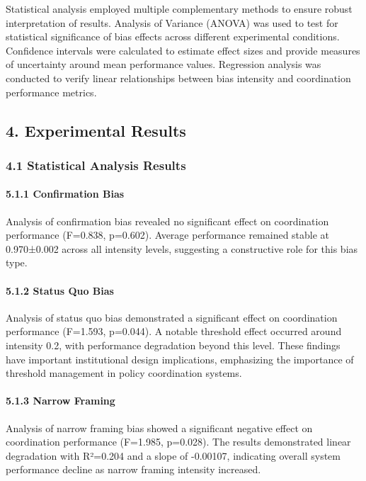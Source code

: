 Statistical analysis employed multiple complementary methods to ensure robust interpretation of results. Analysis of Variance (ANOVA) was used to test for statistical significance of bias effects across different experimental conditions. Confidence intervals were calculated to estimate effect sizes and provide measures of uncertainty around mean performance values. Regression analysis was conducted to verify linear relationships between bias intensity and coordination performance metrics.

\subsection{4. Experimental Results}\label{experimental-results}

\subsubsection{4.1 Statistical Analysis Results}\label{statistical-analysis-results}

\paragraph{5.1.1 Confirmation Bias}\label{confirmation-bias-1}

Analysis of confirmation bias revealed no significant effect on coordination performance (F=0.838, p=0.602). Average performance remained stable at 0.970±0.002 across all intensity levels, suggesting a constructive role for this bias type.

\paragraph{5.1.2 Status Quo Bias}\label{status-quo-bias-1}

Analysis of status quo bias demonstrated a significant effect on coordination performance (F=1.593, p=0.044). A notable threshold effect occurred around intensity 0.2, with performance degradation beyond this level. These findings have important institutional design implications, emphasizing the importance of threshold management in policy coordination systems.

\paragraph{5.1.3 Narrow Framing}\label{narrow-framing}

Analysis of narrow framing bias showed a significant negative effect on coordination performance (F=1.985, p=0.028). The results demonstrated linear degradation with R²=0.204 and a slope of -0.00107, indicating overall system performance decline as narrow framing intensity increased.

